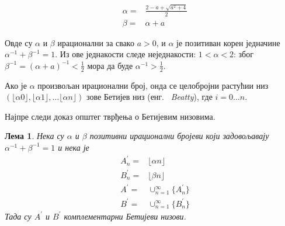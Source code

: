 \documentclass[a4paper]{article}
\newtheorem{lemma}{Лема}
\begin{document}
\begin{eqnarray}
	&\alpha = &\frac{2 - a + \sqrt{a^2 + 4}}{2} \label{def:alpha}\\  
	&\beta = &\alpha + a \label{def:beta}
\end{eqnarray}

Овде су $ \alpha $ и $ \beta $ ирационални за свако $ a > 0 $, и $ \alpha $ је позитиван корен једначине $ \alpha^{-1} + \beta^{-1} = 1 $. Из ове једнакости следе неједнакости:
$ 1<\alpha<2 $: због $ \beta^{-1} = (\alpha+a)^{-1} < \frac{1}{2 }$ мора да буде $ \alpha^{-1} > \frac{1}{2} $.

Ако је $ \alpha $ произвољан ирационални број, онда се целобројни растућии низ $ (\lfloor \alpha 0 \rfloor, \lfloor \alpha 1 \rfloor, \dots \lfloor \alpha n \rfloor) $ зове Бетијев низ (енг. {~\em Beatty}), где $ i = 0 \ldots n $.

Најпре следи доказ општег тврђења о Бетијевим низовима.

\begin{lemma}
	Нека су $ \alpha $ и $ \beta $ позитивни ирационални бројеви који задовољавају $ \alpha^{-1} + \beta^{-1} = 1 $ и нека је 
	\begin{eqnarray*} 
		&A_{n}^{'} = &\lfloor \alpha n \rfloor\\
		&B_{n}^{'} = &\lfloor \beta n \rfloor\\
		&A^{'} = &\cup_{n=1}^{\infty}\{A_{n}^{'}\}\\
		&B^{'} = &\cup_{n=1}^{\infty}\{B_{n}^{'}\}
	\end{eqnarray*}
	Тада су $ A^{'} $ и $ B^{'} $ комплементарни Бетијеви низови.
\end{lemma}
\end{document}
